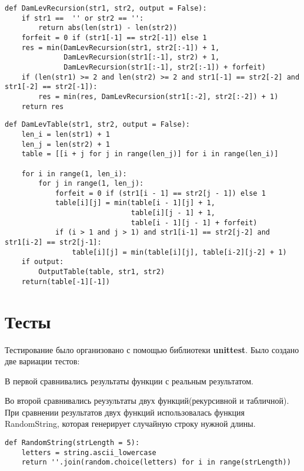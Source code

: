 \documentclass[12pt]{report}
\begin{document}
\begin{lstlisting}[label=some-code,caption=Функция нахождения расстояния Дамерау-Левенштейна рекурсивно]
def DamLevRecursion(str1, str2, output = False):
    if str1 ==  '' or str2 == '':
        return abs(len(str1) - len(str2))
    forfeit = 0 if (str1[-1] == str2[-1]) else 1
    res = min(DamLevRecursion(str1, str2[:-1]) + 1,
              DamLevRecursion(str1[:-1], str2) + 1,
              DamLevRecursion(str1[:-1], str2[:-1]) + forfeit)
    if (len(str1) >= 2 and len(str2) >= 2 and str1[-1] == str2[-2] and str1[-2] == str2[-1]):
        res = min(res, DamLevRecursion(str1[:-2], str2[:-2]) + 1)
    return res 
\end{lstlisting}

\begin{lstlisting}[label=some-code,caption=Функция нахождения расстояния Дамерау-Левенштейна матрично]
def DamLevTable(str1, str2, output = False):
    len_i = len(str1) + 1
    len_j = len(str2) + 1
    table = [[i + j for j in range(len_j)] for i in range(len_i)]
    
    for i in range(1, len_i):
        for j in range(1, len_j):
            forfeit = 0 if (str1[i - 1] == str2[j - 1]) else 1
            table[i][j] = min(table[i - 1][j] + 1,
                              table[i][j - 1] + 1,
                              table[i - 1][j - 1] + forfeit)
            if (i > 1 and j > 1) and str1[i-1] == str2[j-2] and str1[i-2] == str2[j-1]:
                table[i][j] = min(table[i][j], table[i-2][j-2] + 1)
    if output:        
        OutputTable(table, str1, str2)
    return(table[-1][-1])
\end{lstlisting}

\section{Тесты}
Тестирование было организовано с помощью библиотеки  \textbf{unittest}.
Было создано две вариации тестов:

В первой сравнивались результаты функции с реальным результатом.

Во второй сравнивались реузультаты двух функций(рекурсивной и табличной).
При сравнении результатов двух функций использовалась функция RandomString, которая генерирует случайную строку нужной длины.

\begin{lstlisting}[label=randStr,caption=Функция генерации случайной строки]
def RandomString(strLength = 5):
    letters = string.ascii_lowercase
    return ''.join(random.choice(letters) for i in range(strLength))
\end{lstlisting}
\end{document}
